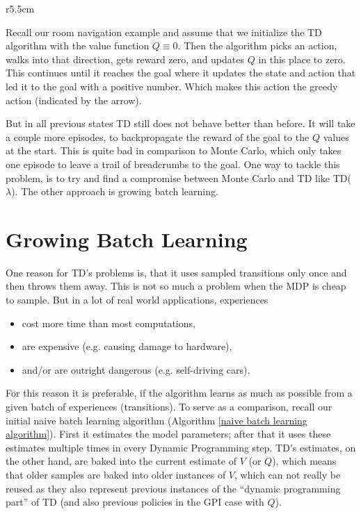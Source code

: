 \begin{wrapfigure}{r}{5.5cm}
	\begin{center}
	\end{center}
\end{wrapfigure}

 Recall our room navigation example and assume that we initialize the TD algorithm with the value function \({Q\equiv 0}\). Then the algorithm picks an action, walks into that direction, gets reward zero, and updates \(Q\) in this place to zero. This continues until it reaches the goal where it updates the state and action that led it to the goal with a positive number. Which makes this action the greedy action (indicated by the arrow). 
 
 But in all previous states TD still does not behave better than before. It will take a couple more episodes, to backpropagate the reward of the goal to the \(Q\) values at the start. This is quite bad in comparison to Monte Carlo, which only takes one episode to leave a trail of breadcrumbs to the goal. One way to tackle this problem, is to try and find a compromise between Monte Carlo and TD like TD(\(\lambda\)). The other approach is growing batch learning. 


\section{Growing Batch Learning}\label{growing batch learning}
One reason for TD's problems is, that it uses sampled transitions only once and then throws them away. This is not so much a problem when the MDP is cheap to sample. But in a lot of real world applications, experiences 
\begin{itemize}[nosep]
	\item cost more time than most computations,
	\item are expensive (e.g. causing damage to hardware),
	\item and/or are outright dangerous (e.g. self-driving cars).
\end{itemize}
For this reason it is preferable, if the algorithm learns as much as possible from a given batch of experiences (transitions). To serve as a comparison, recall our initial naive batch learning algorithm (Algorithm \ref{naive batch learning algorithm}). First it estimates the model parameters; after that it uses these estimates multiple times in every Dynamic Programming step. TD's estimates, on the other hand, are baked into the current estimate of \(V\) (or \(Q\)), which means that older samples are baked into older instances of \(V\), which can not really be reused as they also represent previous instances of the ``dynamic programming part'' of TD (and also previous policies in the GPI case with \(Q\)).

